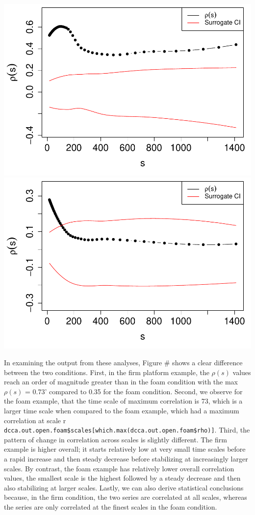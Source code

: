 \documentclass[
  man]{apa6}
\begin{document}
\includegraphics{fractal_regression_paper_brm_files/figure-latex/unnamed-chunk-21-1.pdf} \includegraphics{fractal_regression_paper_brm_files/figure-latex/unnamed-chunk-21-2.pdf}

In examining the output from these analyses, Figure \# shows a clear
difference between the two conditions. First, in the firm platform
example, the \(\rho(s)\) values reach an order of magnitude greater than
in the foam condition with the max \(\rho(s)\) =
0.73' compared to
0.35 for the foam condition. Second, we
observe for the foam example, that the time scale of maximum correlation
is 73,
which is a larger time scale when compared to the foam example, which
had a maximum correlation at scale r
\texttt{dcca.out.open.foam\$scales{[}which.max(dcca.out.open.foam\$rho){]}}. Third,
the pattern of change in correlation across scales is slightly
different. The firm example is higher overall; it starts relatively low
at very small time scales before a rapid increase and then steady
decrease before stabilizing at increasingly larger scales. By contrast,
the foam example has relatively lower overall correlation values, the
smallest scale is the highest followed by a steady decrease and then
also stabilizing at larger scales. Lastly, we can also derive
statistical conclusions because, in the firm condition, the two series
are correlated at all scales, whereas the series are only correlated at
the finest scales in the foam condition.
\end{document}
